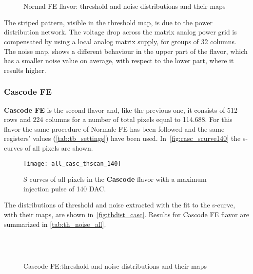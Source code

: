 \begin{figure}[h!]
\centering
{}\quad
{}\\
\quad
{}\\
\caption{Normal FE flavor: threshold and noise distributions and their maps}
\label{fig:thdist_norm}
\end{figure}

The striped pattern, visible in the threshold map, is due to the power distribution network. The voltage drop across the matrix analog power grid is compensated by using a local analog matrix supply, for groups of 32 columns. \\


The noise map, shows a different behaviour in the upper part of the flavor, which has a smaller noise value on average, with respect to the lower part, where it results higher.  




\subsubsection{Cascode FE}

\textbf{Cascode FE} is the second flavor and, like the previous one, it consists of 512 rows and 224 columns for a number of total pixels equal to 114.688. For this flavor the same procedure of Normale FE has been followed and the same registers' values (\autoref{tab:tb_settings}) have been used.
In~\autoref{fig:casc_scurve140} the s-curves of all pixels are shown.

\begin{figure}[h!]
\centering
\texttt{[image: all\_casc\_thscan\_140]}
\caption{S-curves of all pixels in the \textbf{Cascode} flavor with a maximum injection pulse of 140 DAC.}
\label{fig:casc_scurve140}
\end{figure}

The distributions of threshold and noise extracted with the fit to the s-curve, with their maps, are shown in~\autoref{fig:thdist_casc}. Results for Cascode FE flavor are summarized in \autoref{tab:th_noise_all}.


\begin{figure}[h!]
\centering
{}\quad
{}\\
\quad
{}\\
\caption{Cascode FE:threshold and noise distributions and their maps}
\label{fig:thdist_casc}
\end{figure}



